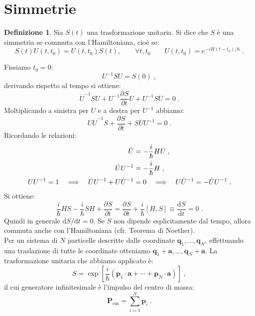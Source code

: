 \documentclass[12pt,a4paper]{report}
\theoremstyle{definition}
\newtheorem{dfn}{Definizione}[section]
\newcommand{\pdev}[3][]{\frac{\partial^{#1} #2}{\partial #3^{#1}}}
\newcommand{\dev}[3][]{\frac{\mathrm{d}^{#1} #2}{\mathrm{d} #3^{#1}}}
\numberwithin{equation}{section}
\newcommand{\diff}[1][]{\mathrm{d}#1}
\begin{document}
\section{Simmetrie}
\begin{dfn} Sia $S(t)$ una trasformazione unitaria. Si dice che $S$ è una simmetria se commuta con l'Hamiltoniana, cioè se:
\begin{equation}
S(t)U(t,t_0)=U(t,t_0)S(t), \qquad \forall t,t_0 \qquad U(t,t_0)=e^{-iH(t-t_0)/\hbar}\;.
\end{equation}
\end{dfn}
Fissiamo $t_0=0$:
\begin{equation}
U^{-1}SU=S(0)\;,
\end{equation}
derivando rispetto al tempo si ottiene:
\begin{equation}
\dot{U}^{-1}SU+U^{-1}\pdev{S}{t}U+U^{-1}S\dot{U}=0\;.
\end{equation}
Moltiplicando a sinistra per $U$ e a destra per $U^{-1}$ abbiamo:
\begin{equation}
U\dot{U}^{-1}S+\pdev{S}{t}+S\dot{U}U^{-1}=0\;.
\end{equation}
Ricordando le relazioni:
\begin{align}
\dot{U}&= -\frac{i}{\hbar}HU \notag\;, \\
\dot{U}U^{-1}&= -\frac{i}{\hbar}H \notag\;, \\
UU^{-1} = 1 \quad \Longrightarrow \quad \dot{U}U^{-1}+U\dot{U}^{-1}&=0\quad \Longrightarrow\quad U\dot{U}^{-1}=-\dot{U}U^{-1}\;.
\end{align}
Si ottiene:
\begin{equation}
\frac{i}{\hbar}HS-\frac{i}{\hbar}SH+\pdev{S}{t}=\pdev{S}{t}+\frac{i}{\hbar}[H,S]\equiv\dev{S}{t}=0\;.
\end{equation}
Quindi in generale $\diff{S}/\diff{t}=0$. Se $S$ non dipende esplicitamente dal tempo, allora commuta anche con l'Hamiltoniana (cfr. Teorema di Noether). \\
Per un sistema di $N$ particelle descritte dalle coordinate $\mathbf{q}_1,\ldots,\mathbf{q}_N$, effettuando una traslazione di tutte le coordinate otteniamo $\mathbf{q}_1+\mathbf{a},\ldots,\mathbf{q}_N+\mathbf{a}$. La trasformazione unitaria che abbiamo applicato è:
\begin{equation}
S=\exp\left[\frac{i}{\hbar}\left(\mathbf{p}_1\cdot\mathbf{a}+\cdots+\mathbf{p}_N\cdot\mathbf{a}\right)\right]\;,
\end{equation}
il cui generatore infinitesimale è l'impulso del centro di massa:
\begin{equation}
\mathbf{P}_{\mathrm{cm}}=\sum_{i=1}^N \mathbf{p}_i\;.
\end{equation}
\end{document}
